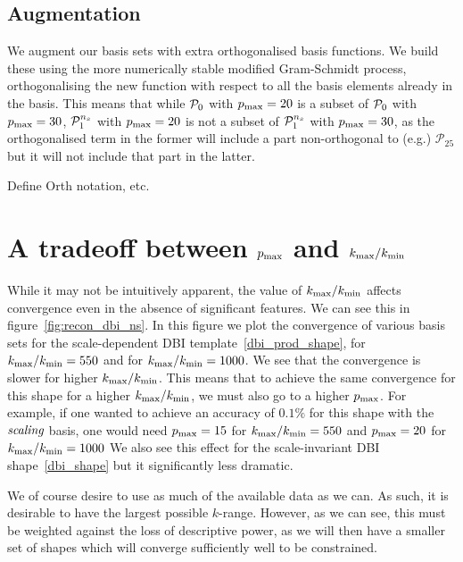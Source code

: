     \subsection{Augmentation}
    We augment our basis sets with extra orthogonalised basis functions.
    We build these using the more numerically stable modified Gram-Schmidt process,
    orthogonalising the new function with respect to all the basis elements already in
    the basis. This means that while $\mathcal{P}_0$ with $p_\text{max}=20$ is a subset of
    $\mathcal{P}_0$ with $p_\text{max}=30$, $\mathcal{P}^{n_s}_1$ with $p_\text{max}=20$ is not a subset of
    $\mathcal{P}^{n_s}_1$ with $p_\text{max}=30$, as the orthogonalised term in the former will include a part
    non-orthogonal to (e.g.) $\mathcal{P}_{25}$ but it will not include that part in the latter.


    Define Orth notation, etc.
\section{A tradeoff between $p_\text{max}$ and ${k_\text{max}}/{k_\text{min}}$}
    While it may not be intuitively apparent, the value of ${k_\text{max}}/{k_\text{min}}$
    affects convergence even in the absence of significant features.
    We can see this in figure~\ref{fig:recon_dbi_ns}.
    In this figure we plot the convergence of various basis sets for the scale-dependent
    DBI template~\eqref{dbi_prod_shape}, for ${k_\text{max}}/{k_\text{min}}=550$ and
    for ${k_\text{max}}/{k_\text{min}}=1000$. We see that the convergence is slower
    for higher ${k_\text{max}}/{k_\text{min}}$. This means that to achieve the same convergence
    for this shape for a higher ${k_\text{max}}/{k_\text{min}}$, we must also go to a higher $p_\text{max}$.
    For example, if one wanted to achieve an accuracy of $0.1\%$ for this shape
    with the $\textit{scaling}$ basis,
    one would need $p_\text{max}=15$ for ${k_\text{max}}/{k_\text{min}}=550$
    and $p_\text{max}=20$ for ${k_\text{max}}/{k_\text{min}}=1000$
    We also see this effect for the scale-invariant DBI shape~\eqref{dbi_shape}
    but it significantly less dramatic.


    We of course desire to use as much of the available data as we can.
    As such, it is desirable to have the largest possible $k$-range.
    However, as we can see, this must be weighted against the loss
    of descriptive power, as we will then have a smaller set of shapes which
    will converge sufficiently well to be constrained.

